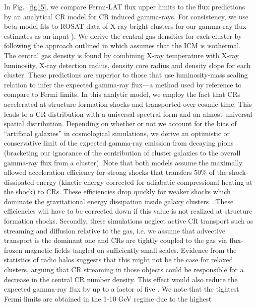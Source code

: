 \documentclass[10pt,aps,pra,reprint,amsmath,amsfonts,amssymb,showpacs,nofootinbib,floatfix]{revtex4-1}
\begin{document}
In Fig.~\ref{fig15}, we compare Fermi-LAT flux upper limits to the
flux predictions by an analytical CR model \cite{2010MNRAS.409..449P}
for CR induced gamma-rays. For consistency, we use beta-model fits to
ROSAT data of X-ray bright clusters for our gamma-ray flux estimates
as an input \cite{2002ApJ...567..716R}). We derive the central gas
densities for each cluster by following the approach outlined in
\cite{1999ApJ...517..627M} which assumes that the ICM is
isothermal. The central gas density is found by combining X-ray
temperature with X-ray luminosity, X-ray detection radius, density
core radius and density slope for each cluster. These predictions are
superior to those that use luminosity-mass scaling relation to infer
the expected gamma-ray flux---a method used by reference
\cite{2010ApJ...717L..71A} to compare to Fermi limits.  In this
analytic model, we employ the fact that CRs accelerated at structure
formation shocks and transported over cosmic time. This leads to a CR
distribution with a universal spectral form and an almost universal
spatial distribution. Depending on whether or not we account for the
bias of ``artificial galaxies'' in cosmological simulations, we derive
an optimistic or conservative limit of the expected gamma-ray emission
from decaying pions (bracketing our ignorance of the contribution of
cluster galaxies to the overall gamma-ray flux from a cluster). Note
that both models assume the maximally allowed acceleration efficiency
for strong shocks that transfers 50\% of the shock-dissipated energy
(kinetic energy corrected for adiabatic compressional heating at the
shock) to CRs. These efficiencies drop quickly for weaker shocks
\cite{2007A&A...473...41E} which dominate the gravitational energy
dissipation inside galaxy clusters \cite{2006MNRAS.367..113P}. These
efficiencies will have to be corrected down if this value is not
realized at structure formation shocks. Secondly, these simulations
neglect active CR transport such as streaming and diffusion relative
to the gas, i.e. we assume that advective transport is the dominant
one and CRs are tightly coupled to the gas via flux-frozen magnetic
fields tangled on sufficiently small scales. Evidence from the
statistics of radio halos suggests that this might not be the case for
relaxed clusters, arguing that CR streaming in those objects could be
responsible for a decrease in the central CR number density. This
effect would also reduce the expected gamma-ray flux by up to a factor
of five \cite{2011A&A...527A..99E}. We note that the tightest Fermi
limits are obtained in the 1-10 GeV regime due to the highest
\end{document}
